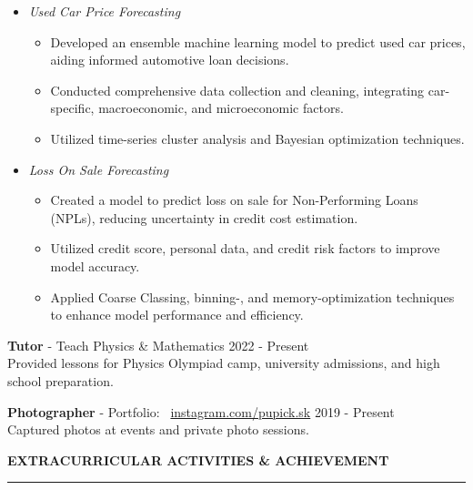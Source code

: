 \documentclass[11pt]{article}
\begin{document}
\begin{itemize}[topsep=0pt, parsep=0pt]
    \item \textit{Used Car Price Forecasting}
    {\fontsize{10pt}{11pt}\selectfont
    \begin{itemize}[noitemsep, topsep=0pt, partopsep=0pt, parsep=0pt, leftmargin=*]
        \item Developed an ensemble machine learning model to predict used car prices, aiding informed automotive loan decisions.
        \item Conducted comprehensive data collection and cleaning, integrating car-specific, macroeconomic, and microeconomic factors.
        \item Utilized time-series cluster analysis and Bayesian optimization techniques.
    \end{itemize}
    }
    \item \textit{Loss On Sale Forecasting}
    {\fontsize{10pt}{11pt}\selectfont
    \begin{itemize}[noitemsep, topsep=0pt, partopsep=0pt, parsep=0pt, leftmargin=*]
        \item Created a model to predict loss on sale for Non-Performing Loans (NPLs), reducing uncertainty in credit cost estimation.
        \item Utilized credit score, personal data, and credit risk factors to improve model accuracy.
        \item Applied Coarse Classing, binning-, and memory-optimization techniques to enhance model performance and efficiency.
    \end{itemize}
    }
\end{itemize}

\textbf{Tutor} - Teach Physics \& Mathematics \hfill 2022 - Present\\
\hspace*{7pt} Provided lessons for Physics Olympiad camp, university admissions, and high school preparation.

\vspace{3pt}

\textbf{Photographer} - Portfolio: \faInstagram\ \href{https://www.instagram.com/pupick.sk}{instagram.com/pupick.sk} \hfill 2019 - Present\\
\hspace*{7pt} Captured photos at events and private photo sessions.

\vspace{9pt}
\textbf{EXTRACURRICULAR ACTIVITIES \& ACHIEVEMENT}
\vspace{5pt}
{\color{NavyBlue}\hrule}
\vspace{6pt}
\end{document}
